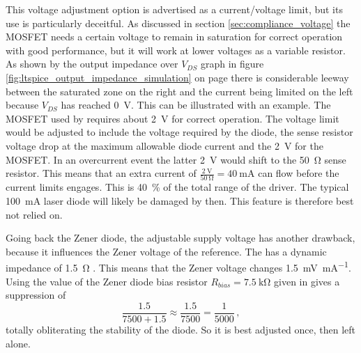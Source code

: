 This voltage adjustment option is advertised as a current/voltage limit, but its use is particularly deceitful. As discussed in section \ref{sec:compliance_voltage} the MOSFET needs a certain voltage to remain in saturation for correct operation with good performance, but it will work at lower voltages as a variable resistor. As shown by the output impedance over $V_{DS}$ graph in figure \ref{fig:ltspice_output_impedance_simulation} on page \pageref{fig:ltspice_output_impedance_simulation} there is considerable leeway between the saturated zone on the right and the current being limited on the left because $V_{DS}$ has reached \qty{0}{\V}. This can be illustrated with an example. The  MOSFET \cite{datasheet_VP0106} used by \citeauthor{libbrecht_hall} \cite{libbrecht_hall} requires about \qty{2}{\V} for correct operation. The voltage limit would be adjusted to include the voltage required by the diode, the sense resistor voltage drop at the maximum allowable diode current and the \qty{2}{\V} for the MOSFET. In an overcurrent event the latter \qty{2}{\V} would shift to the \qty{50}{\ohm} sense resistor. This means that an extra current of $\frac{\qty{2}{\V}}{\qty{50}{\ohm}} = \qty{40}{\mA}$ can flow before the current limits engages. This is \qty{40}{\percent} of the total range of the driver. The typical \qty{100}{\mA} laser diode will likely be damaged by then. This feature is therefore best not relied on.

Going back the Zener diode, the adjustable supply voltage has another drawback, because it influences the Zener voltage of the reference. The  has a dynamic impedance of \qty{1.5}{\ohm} \cite{datasheet_LM399}. This means that the Zener voltage changes \qty{1.5}{\mV \per \mA}. Using the value of the Zener diode bias resistor $R_{bias} = \qty{7.5}{\kilo\ohm}$ given in \cite{libbrecht_hall} gives a suppression of
\begin{equation*}
\frac{1.5}{7500 + 1.5} \approx \frac{1.5}{7500} = \frac{1}{5000} \,,
\end{equation*}
totally obliterating the stability of the diode. So it is best adjusted once, then left alone.

